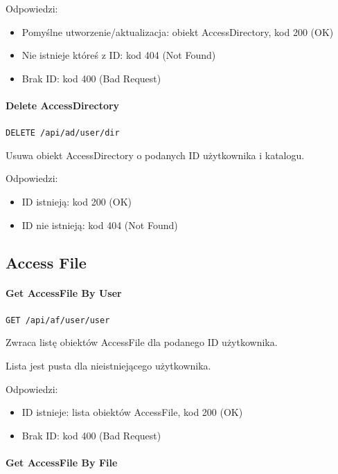 \documentclass[a4paper,twoside,12pt]{book}
\begin{document}
Odpowiedzi: 
\begin{itemize}
	\item Pomyślne utworzenie/aktualizacja: obiekt AccessDirectory, kod 200 (OK) 
	\item Nie istnieje któreś z ID: kod 404 (Not Found) 
	\item Brak ID: kod 400 (Bad Request)
\end{itemize}

\paragraph{Delete AccessDirectory}\label{delete-accessdirectory}

\texttt{DELETE /api/ad/{user}/{dir}}

Usuwa obiekt AccessDirectory o podanych ID użytkownika i katalogu.

Odpowiedzi: 
\begin{itemize}
	\item ID istnieją: kod 200 (OK) 
	\item ID nie istnieją: kod 404 (Not Found)
\end{itemize}

\subsection{Access File}\label{access-file}

\paragraph{Get AccessFile By User}\label{get-accessfile-by-user}

\texttt{GET /api/af/user/{user}}

Zwraca listę obiektów AccessFile dla podanego ID użytkownika.

Lista jest pusta dla nieistniejącego użytkownika.

Odpowiedzi: 
\begin{itemize}
	\item ID istnieje: lista obiektów AccessFile, kod 200 (OK) 
	\item Brak ID: kod 400 (Bad Request)
\end{itemize}

\paragraph{Get AccessFile By File}\label{get-accessfile-by-file}
\end{document}
